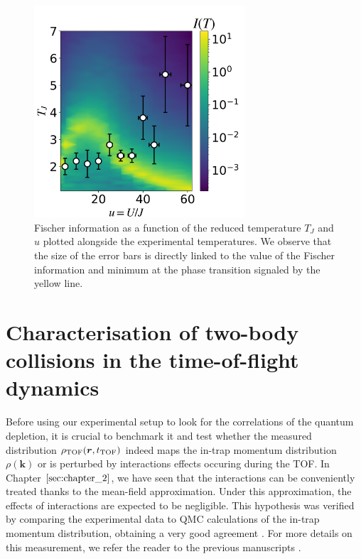 \begin{figure}
    \centering
    \includegraphics[width=0.7\textwidth]{Fig/Chapter3/fisher_info.png}
    \caption[Fischer information as a function of the reduced temperature $T_J$ and $u$]{Fischer information as a function of the reduced temperature $T_J$ and $u$ plotted alongside the experimental temperatures. We observe that the size of the error bars is directly linked to the value of the Fischer information and minimum at the phase transition signaled by the yellow line.}
    \label{fig:fisher_info}
\end{figure}


\section{Characterisation of two-body collisions in the time-of-flight dynamics}

Before using our experimental setup to look for the \kmk correlations of the quantum depletion, it is crucial to benchmark it and test whether the measured distribution $\rho_{\rm{TOF}} (\bm{r},t_{\rm{TOF}})$ indeed maps the in-trap momentum distribution $\rho(\bm{k})$ or is perturbed by interactions effects occuring during the TOF. In Chapter $\ref{sec:chapter_2}$, we have seen that the interactions can be conveniently treated thanks to the mean-field approximation. Under this approximation, the effects of interactions are expected to be negligible. This hypothesis was verified by comparing the experimental data to QMC calculations of the in-trap momentum distribution, obtaining a very good agreement \cite{cayla2018single}. For more details on this measurement, we refer the reader to the previous manuscripts \cite{carcy_these,cayla_these}.


